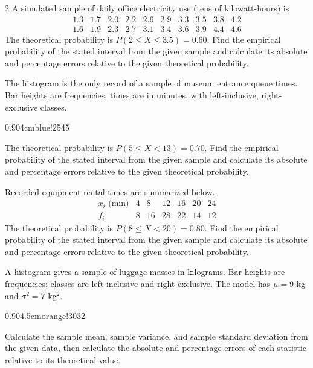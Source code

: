 \begin{multicols}{2}
\label{sec:c6-2}
A simulated sample of daily office electricity use (tens of kilowatt-hours) is
\[
\begin{array}{cccccccccc}
1.3&1.7&2.0&2.2&2.6&2.9&3.3&3.5&3.8&4.2\\
1.6&1.9&2.3&2.7&3.1&3.4&3.6&3.9&4.4&4.6
\end{array}
\]
The theoretical probability is $P(2\le X\le3.5)=0.60$.
Find the empirical probability of the stated interval from the given sample and calculate its absolute and percentage errors relative to the given theoretical probability. 

\columnbreak

\label{sec:c6-3}
The histogram is the only record of a sample of museum entrance queue times.
Bar heights are frequencies; times are in minutes, with left-inclusive,
right-exclusive classes.
\begin{center}
{0.90\linewidth}{4cm}{blue!25}{4}{5}
\end{center}\vspace{-4mm}
The theoretical probability is $P(5\le X<13)=0.70$.
Find the empirical probability of the stated interval from the given sample and calculate its absolute and percentage errors relative to the given theoretical probability. 


\label{sec:c6-4}
Recorded equipment rental times are summarized below.
\[
\begin{array}{c|rrrrrr}
x_i\text{ (min)}&4&8&12&16&20&24\\\hline
f_i&8&16&28&22&14&12
\end{array}
\]
The theoretical probability is $P(8\le X<20)=0.80$.
Find the empirical probability of the stated interval from the given sample and calculate its absolute and percentage errors relative to the given theoretical probability. 

\columnbreak

\label{sec:c7-1}
A histogram gives a sample of luggage masses in kilograms. Bar heights are
frequencies; classes are left-inclusive and right-exclusive.
The model has $\mu=9$ kg and $\sigma^2=7$ kg$^2$.
\begin{center}
{0.90\linewidth}{4.5cm}{orange!30}{3}{2}
\end{center}
Calculate the sample mean, sample variance, and sample standard deviation from the given data, then calculate the absolute and percentage errors of each statistic relative to its theoretical value. 




\end{multicols}
